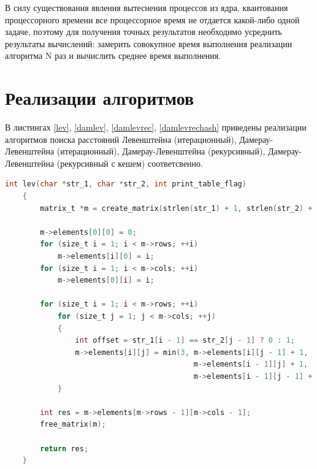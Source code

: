 \documentclass[a4paper,14pt, unknownkeysallowed]{extreport}
\begin{document}
	В силу существования явления вытеснения процессов из ядра, квантования процессорного времени все процессорное время не отдается какой-либо одной задаче, поэтому для получения точных результатов необходимо усреднить результаты вычислений: замерить совокупное время выполнения реализации алгоритма N раз и вычислить среднее время выполнения.
		
	\section{Реализации алгоритмов}
	
	В листингах \ref{lev}, \ref{damlev}, \ref{damlevrec}, \ref{damlevrechash} приведены реализации алгоритмов поиска расстояний Левенштейна (итерационный), Дамерау-Левенштейна (итерационный), \mbox{Дамерау-Левенштейна} (рекурсивный), Дамерау-Левенштейна (рекурсивный с кешем) соответсвенно.
	
	\begin{lstlisting}[label=lev,caption=Листинг итерационного алгоритма поиска расстояния Левенштейна,language=C]
    int lev(char *str_1, char *str_2, int print_table_flag)
    {
        matrix_t *m = create_matrix(strlen(str_1) + 1, strlen(str_2) + 1);
    
        m->elements[0][0] = 0;
        for (size_t i = 1; i < m->rows; ++i)
            m->elements[i][0] = i;
        for (size_t i = 1; i < m->cols; ++i)
            m->elements[0][i] = i;
    
        for (size_t i = 1; i < m->rows; ++i)
            for (size_t j = 1; j < m->cols; ++j) 
    		{
                int offset = str_1[i - 1] == str_2[j - 1] ? 0 : 1;
                m->elements[i][j] = min(3, m->elements[i][j - 1] + 1,
                                           m->elements[i - 1][j] + 1,
                                           m->elements[i - 1][j - 1] + offset);
            }
    
        int res = m->elements[m->rows - 1][m->cols - 1];
        free_matrix(m);
    
        return res;
    }
	\end{lstlisting}
\end{document}
